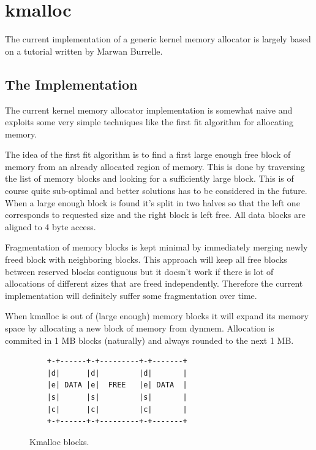 \chapter{kmalloc}

The current implementation of a generic kernel memory allocator is largely
based on a tutorial written by Marwan Burrelle\cite{Burelle:malloc}.

\section{The Implementation}

The current kernel memory allocator implementation is somewhat naive and
exploits some very simple techniques like the first fit algorithm for allocating
memory.

The idea of the first fit algorithm is to find a first large enough free block
of memory from an already allocated region of memory. This is done by traversing
the list of memory blocks and looking for a sufficiently large block. This is
of course quite sub-optimal and better solutions has to be considered in the
future. When a large enough block is found it's split in two halves so that the
left one corresponds to requested size and the right block is left free. All data
blocks are aligned to 4 byte access.

Fragmentation of memory blocks is kept minimal by immediately merging newly freed
block with neighboring blocks. This approach will keep all free blocks between
reserved blocks contiguous but it doesn't work if there is lot of allocations of
different sizes that are freed independently. Therefore the current implementation
will definitely suffer some fragmentation over time.

When kmalloc is out of (large enough) memory blocks it will expand its memory
space by allocating a new block of memory from dynmem. Allocation is commited in
1 MB blocks (naturally) and always rounded to the next 1 MB.

\begin{figure}
\begin{verbatim}
    +-+------+-+---------+-+-------+
    |d|      |d|         |d|       |
    |e| DATA |e|  FREE   |e| DATA  |
    |s|      |s|         |s|       |
    |c|      |c|         |c|       |
    +-+------+-+---------+-+-------+
\end{verbatim}
\caption{Kmalloc blocks.}
\label{figure:kmalloc_blocks}
\end{figure}


